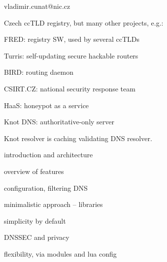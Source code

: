 
\englishenv

\pageAspectRatio[16:9]

\subtitle{\bigskip{}}
\author{Vladimir Cunat}{vladimir.cunat@nic.cz}
\date[2018-05-23]


Czech ccTLD registry,
but many other projects, e.g.:
\bulletList
\item FRED: registry SW, used by several ccTLDs
\item Turris: self-updating secure hackable routers
\item BIRD: routing daemon
\item CSIRT.CZ: national security response team
\item HaaS: honeypot as a service
\item Knot DNS: authoritative-only server
\endBulletList


\slide[Contents]
Knot resolver is caching validating DNS resolver.

\bulletList
\item introduction and architecture

\item overview of features

\item configuration, filtering DNS

\endBulletList


\bulletList

\item minimalistic approach -- libraries

\item simplicity by default

\item DNSSEC and privacy

\item flexibility, via modules and lua config
\endBulletList


